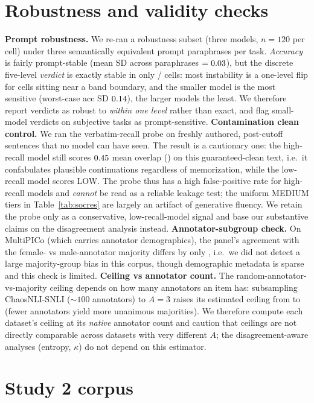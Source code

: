 \section{Robustness and validity checks}\label{app:robust}
\textbf{Prompt robustness.} We re-ran a robustness subset (three models, $n{=}120$ per cell) under
three semantically equivalent prompt paraphrases per task. \emph{Accuracy} is fairly prompt-stable (mean SD across
paraphrases $=0.03$), but the discrete five-level \emph{verdict} is exactly stable in only \PRstable{}/\PRtotal{}
cells: most instability is a one-level flip for cells sitting near a band boundary, and the smaller model is the most
sensitive (worst-case acc SD $0.14$), the larger models the least. We therefore report verdicts as robust to
\emph{within one level} rather than exact, and flag small-model verdicts on subjective tasks as prompt-sensitive.
\textbf{Contamination clean control.} We ran the verbatim-recall probe on freshly authored, post-cutoff sentences
that no model can have seen. The result is a cautionary one: the high-recall model still scores $0.45$ mean
overlap (\CCflag) on this guaranteed-clean text, i.e.\ it confabulates plausible continuations regardless of
memorization, while the low-recall model scores LOW. The probe thus has a high false-positive rate for high-recall
models and \emph{cannot} be read as a reliable leakage test; the uniform MEDIUM tiers in Table~\ref{tab:socres} are
largely an artifact of generative fluency. We retain the probe only as a conservative, low-recall-model signal and
base our substantive claims on the disagreement analysis instead.
\textbf{Annotator-subgroup check.} On MultiPICo (which carries annotator demographics), the panel's agreement with
the female- vs male-annotator majority differs by only \MPCgenderGap, i.e.\ we did not detect a large majority-group
bias in this corpus, though demographic metadata is sparse and this check is limited.
\textbf{Ceiling vs annotator count.} The random-annotator-vs-majority ceiling depends on how many annotators an item
has: subsampling ChaosNLI-SNLI (${\sim}100$ annotators) to $A{=}3$ raises its estimated ceiling from
\RTwoablCeilFull{} to \RTwoablCeilThree{} (fewer annotators yield more unanimous majorities). We therefore compute
each dataset's ceiling at its \emph{native} annotator count and caution that ceilings are not directly comparable
across datasets with very different $A$; the disagreement-aware analyses (entropy, $\kappa$) do not depend on this
estimator.

\section{Study 2 corpus}\label{app:s2}

